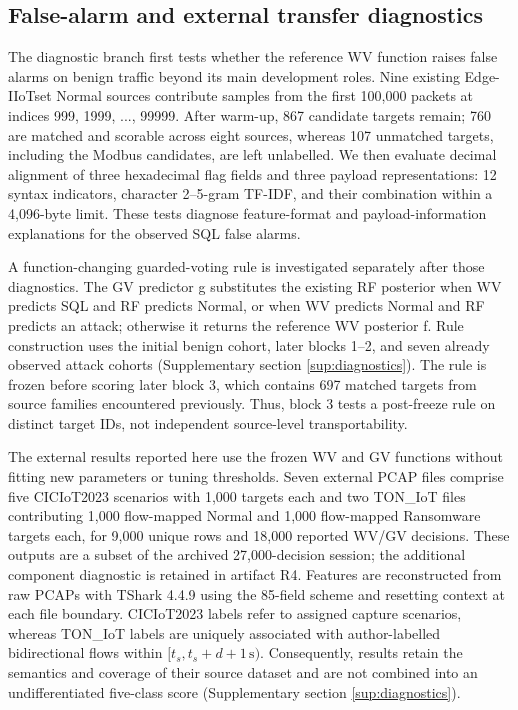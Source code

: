 \documentclass[final,3p,10pt,nopreprintline]{elsarticle}
\begin{document}
\subsection{False-alarm and external transfer diagnostics}

The diagnostic branch first tests whether the reference WV function raises false alarms on benign traffic beyond its main development roles. Nine existing Edge-IIoTset Normal sources contribute samples from the first 100,000 packets at indices 999, 1999, ..., 99999. After warm-up, 867 candidate targets remain; 760 are matched and scorable across eight sources, whereas 107 unmatched targets, including the Modbus candidates, are left unlabelled. We then evaluate decimal alignment of three hexadecimal flag fields and three payload representations: 12 syntax indicators, character 2--5-gram TF-IDF, and their combination within a 4,096-byte limit. These tests diagnose feature-format and payload-information explanations for the observed SQL false alarms.

A function-changing guarded-voting rule is investigated separately after those diagnostics. The GV predictor g substitutes the existing RF posterior when WV predicts SQL and RF predicts Normal, or when WV predicts Normal and RF predicts an attack; otherwise it returns the reference WV posterior f. Rule construction uses the initial benign cohort, later blocks 1--2, and seven already observed attack cohorts (Supplementary section \ref*{sup:diagnostics}). The rule is frozen before scoring later block 3, which contains 697 matched targets from source families encountered previously. Thus, block 3 tests a post-freeze rule on distinct target IDs, not independent source-level transportability.

The external results reported here use the frozen WV and GV functions without fitting new parameters or tuning thresholds. Seven external PCAP files comprise five CICIoT2023 scenarios with 1,000 targets each and two TON\_IoT files contributing 1,000 flow-mapped Normal and 1,000 flow-mapped Ransomware targets each, for 9,000 unique rows and 18,000 reported WV/GV decisions. These outputs are a subset of the archived 27,000-decision session; the additional component diagnostic is retained in artifact R4. Features are reconstructed from raw PCAPs with TShark 4.4.9 using the 85-field scheme and resetting context at each file boundary. CICIoT2023 labels refer to assigned capture scenarios, whereas TON\_IoT labels are uniquely associated with author-labelled bidirectional flows within \([t_s,t_s+d+1\,\mathrm{s})\). Consequently, results retain the semantics and coverage of their source dataset and are not combined into an undifferentiated five-class score (Supplementary section \ref*{sup:diagnostics}).
\end{document}
